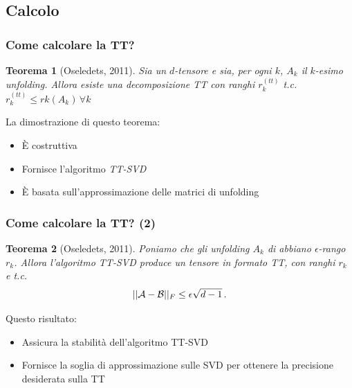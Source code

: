 \documentclass[compress]{beamer}
\theoremstyle{definition}
\theoremstyle{plain}
\newtheorem{teorema}{Teorema}
\begin{document}
\subsection{Calcolo}
\begin{frame}
\frametitle{Come calcolare la TT?}
\begin{teorema}[Oseledets, 2011]
Sia \A un $d$-tensore e sia, per ogni $k$, $A_k$ il $k$-esimo unfolding.
Allora esiste una decomposizione TT con ranghi $r_k^{(tt)}$ t.c. $r_k^{(tt)} \leq rk(A_k) \, \forall k$
\end{teorema}

\vspace{5mm}
La dimostrazione di questo teorema:
\begin{itemize}
	\item \`E costruttiva
	\item Fornisce l'algoritmo \emph{TT-SVD}
	\item \`E basata sull'approssimazione delle matrici di unfolding
\end{itemize}
\end{frame}

\begin{frame}
\frametitle{Come calcolare la TT? (2)}
\begin{teorema}[Oseledets, 2011]
Poniamo che gli unfolding $A_k$ di \A abbiano $\epsilon$-rango $r_k$.
Allora l'algoritmo TT-SVD produce un tensore \B in formato TT, con ranghi $r_k$ e t.c. 
\begin{equation*}
    ||\mathcal{A} - \mathcal{B} ||_F \le \epsilon \sqrt{d-1}\, .
\end{equation*}
\end{teorema}

\vspace{5mm}
Questo risultato:
\begin{itemize}
	\item Assicura la stabilità dell'algoritmo TT-SVD
	\item Fornisce la soglia di approssimazione sulle SVD per ottenere la precisione desiderata sulla TT
\end{itemize}
\end{frame}
\end{document}
